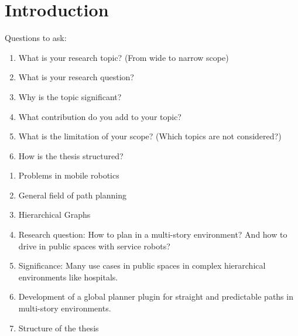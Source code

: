 \chapter{Introduction}
\label{sec:Introduction}
Questions to ask:
\begin{enumerate}
    \item What is your research topic? (From wide to narrow scope)
    \item What is your research question?
    \item Why is the topic significant?
    \item What contribution do you add to your topic?
    \item What is the limitation of your scope? (Which topics are not considered?)
    \item How is the thesis structured?
\end{enumerate}

\begin{enumerate}
    \item Problems in mobile robotics
    \item General field of path planning
    \item Hierarchical Graphs
    \item Research question: How to plan in a multi-story environment? And how to drive in public spaces with service robots?
    \item Significance: Many use cases in public spaces in complex hierarchical environments like hospitals.
    \item Development of a global planner plugin for straight and predictable paths in multi-story environments.
    \item Structure of the thesis
\end{enumerate}